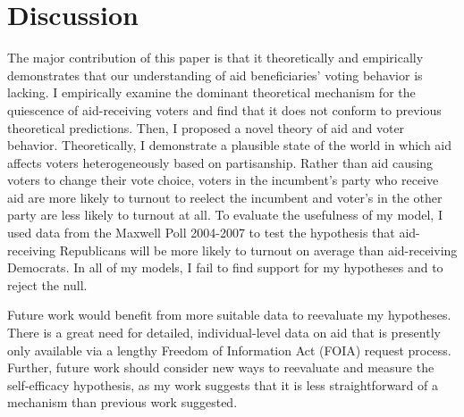\documentclass[12pt]{paper}
\begin{document}
\section{Discussion}
The major contribution of this paper is that it theoretically and empirically demonstrates that our understanding of aid beneficiaries' voting behavior is lacking. I empirically examine the dominant theoretical mechanism for the quiescence of aid-receiving voters and find that it does not conform to previous theoretical predictions. Then, I proposed a novel theory of aid and voter behavior. Theoretically, I demonstrate a plausible state of the world in which aid affects voters heterogeneously based on partisanship. Rather than aid causing voters to change their vote choice, voters in the incumbent's party who receive aid are more likely to turnout to reelect the incumbent and voter's in the other party are less likely to turnout at all. To evaluate the usefulness of my model, I used data from the Maxwell Poll 2004-2007 to test the hypothesis that aid-receiving Republicans will be more likely to turnout on average than aid-receiving Democrats. In all of my models, I fail to find support for my hypotheses and to reject the null.

Future work would benefit from more suitable data to reevaluate my hypotheses. There is a great need for detailed, individual-level data on aid that is presently only available via a lengthy Freedom of Information Act (FOIA) request process. Further, future work should consider new ways to reevaluate and measure the self-efficacy hypothesis, as my work suggests that it is less straightforward of a mechanism than previous work suggested.

%
%
\end{document}
